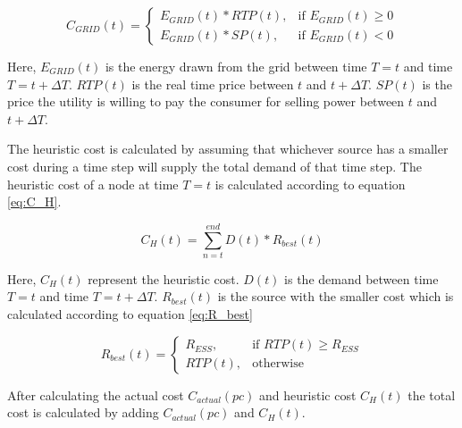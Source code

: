 \begin{equation}
\label{eq:C_GRID}
C_{GRID}(t) = 
\begin{cases}
   E_{GRID}(t)*RTP(t),& \text{if } E_{GRID}(t)\geq 0\\
    E_{GRID}(t)*SP(t),& \text{if }  E_{GRID}(t) < 0
\end{cases}
\end{equation}

Here, $E_{GRID}(t)$ is the energy drawn from the grid between time $T=t$ and time $T=t+\Delta T$. $RTP(t)$ is the real time price between $t$ and $t+\Delta T$. $SP(t)$ is the price the utility is willing to pay the consumer for selling power between $t$ and $t+\Delta T$.

The heuristic cost is calculated by assuming that whichever source has a smaller cost during a time step will supply the total demand of that time step. The heuristic cost of a node at time $T = t$ is calculated according to equation \ref{eq:C_H}.


\begin{equation}
\label{eq:C_H}
C_H(t) = \sum_{n=t}^{end} D(t)*R_{best}(t)
\end{equation}

Here, $C_H(t)$ represent the heuristic cost. $D(t)$ is the demand between time $T = t$ and time $T = t+\Delta T$. $R_{best}(t)$ is the source with the smaller cost which is calculated according to equation \ref{eq:R_best}

\begin{equation}
\label{eq:R_best}
R_{best}(t) = 
\begin{cases}
    R_{ESS},& \text{if } RTP(t)\geq R_{ESS}\\
    RTP(t),              & \text{otherwise}
\end{cases}
\end{equation}

After calculating the actual cost  $C_{actual}(pc)$ and heuristic cost $C_H(t)$ the total cost is calculated by adding  $C_{actual}(pc)$ and $C_H(t)$.

